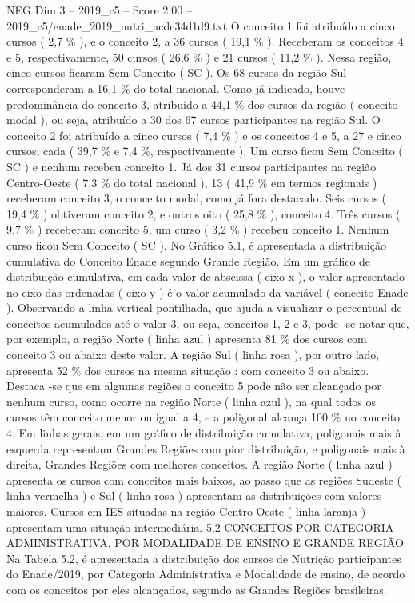 \begin{textsample}{NEG Dim 3 – 2019\_c5 – Score 2.00 – 2019\_c5/enade\_2019\_nutri\_acdc34d1d9.txt}
O conceito 1 foi atribuído a cinco cursos ( 2,7 \% ), e o conceito 2, a 36 cursos ( 19,1 \% ).
Receberam os conceitos 4 e 5, respectivamente, 50 cursos ( 26,6 \% ) e 21 cursos ( 11,2 \% ).
Nessa região, cinco cursos ficaram Sem Conceito ( SC ).
Os 68 cursos da região Sul corresponderam a 16,1 \% do total nacional.
Como já indicado, houve predominância do conceito 3, atribuído a 44,1 \% dos cursos da região ( conceito modal ), ou seja, atribuído a 30 dos 67 cursos participantes na região Sul.
O conceito 2 foi atribuído a cinco cursos ( 7,4 \% ) e os conceitos 4 e 5, a 27 e cinco cursos, cada ( 39,7 \% e 7,4 \%, respectivamente ).
Um curso ficou Sem Conceito ( SC ) e nenhum recebeu conceito 1.
Já dos 31 cursos participantes na região Centro-Oeste ( 7,3 \% do total nacional ), 13 ( 41,9 \% em termos regionais ) receberam conceito 3, o conceito modal, como já fora destacado.
Seis cursos ( 19,4 \% ) obtiveram conceito 2, e outros oito ( 25,8 \% ), conceito 4.
Três cursos ( 9,7 \% ) receberam conceito 5, um curso ( 3,2 \% ) recebeu conceito 1.
Nenhum curso ficou Sem Conceito ( SC ).
No Gráfico 5.1, é apresentada a distribuição cumulativa do Conceito Enade segundo Grande Região.
Em um gráfico de distribuição cumulativa, em cada valor de abscissa ( eixo x ), o valor apresentado no eixo das ordenadas ( eixo y ) é o valor acumulado da variável ( conceito Enade ).
Observando a linha vertical pontilhada, que ajuda a visualizar o percentual de conceitos acumulados até o valor 3, ou seja, conceitos 1, 2 e 3, pode -se notar que, por exemplo, a região Norte ( linha azul ) apresenta 81 \% dos cursos com conceito 3 ou abaixo deste valor.
A região Sul ( linha rosa ), por outro lado, apresenta 52 \% dos cursos na mesma situação : com conceito 3 ou abaixo.
Destaca -se que em algumas regiões o conceito 5 pode não ser alcançado por nenhum curso, como ocorre na região Norte ( linha azul ), na qual todos os cursos têm conceito menor ou igual a 4, e a poligonal alcança 100 \% no conceito 4.
Em linhas gerais, em um gráfico de distribuição cumulativa, poligonais mais à esquerda representam Grandes Regiões com pior distribuição, e poligonais mais à direita, Grandes Regiões com melhores conceitos.
A região Norte ( linha azul ) apresenta os cursos com conceitos mais baixos, ao passo que as regiões Sudeste ( linha vermelha ) e Sul ( linha rosa ) apresentam as distribuições com valores maiores.
Cursos em IES situadas na região Centro-Oeste ( linha laranja ) apresentam uma situação intermediária. 5.2 CONCEITOS POR CATEGORIA ADMINISTRATIVA, POR MODALIDADE DE ENSINO E GRANDE REGIÃO Na Tabela 5.2, é apresentada a distribuição dos cursos de Nutrição participantes do Enade/2019, por Categoria Administrativa e Modalidade de ensino, de acordo com os conceitos por eles alcançados, segundo as Grandes Regiões brasileiras.

\end{textsample}
